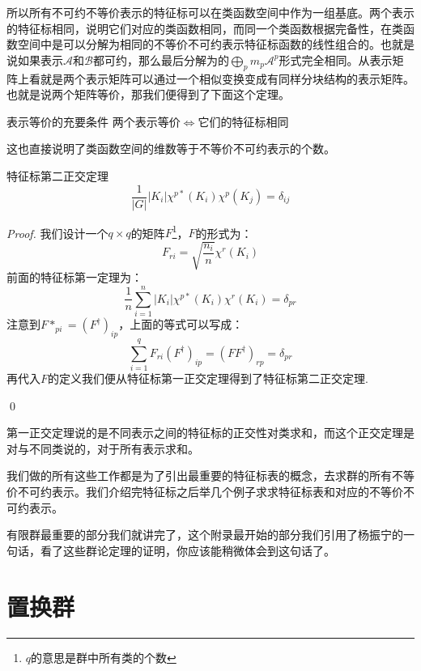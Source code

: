 所以所有不可约不等价表示的特征标可以在类函数空间中作为一组基底。两个表示的特征标相同，说明它们对应的类函数相同，而同一个类函数根据完备性，在类函数空间中是可以分解为相同的不等价不可约表示特征标函数的线性组合的。也就是说如果表示$\mathscr{A}$和$\mathscr{B}$都可约，那么最后分解为的$\bigoplus_p m_p\mathscr{A}^p$形式完全相同。从表示矩阵上看就是两个表示矩阵可以通过一个相似变换变成有同样分块结构的表示矩阵。也就是说两个矩阵等价，那我们便得到了下面这个定理。
\begin{theorem}{表示等价的充要条件}
	两个表示等价$\iff$它们的特征标相同
\end{theorem}
这也直接说明了类函数空间的维数等于不等价不可约表示的个数。
\begin{theorem}{特征标第二正交定理}
	\begin{equation}
		\frac{1}{|G|}|K_i|\chi^{p*}(K_i)\chi^{p}(K_j)=\delta_{ij}
	\end{equation}
\end{theorem}
\begin{proof}
	我们设计一个$q\times q$的矩阵$F$\footnote{$q$的意思是群中所有类的个数}，$F$的形式为：
	\[F_{ri}=\sqrt{\frac{n_i}{n}}\chi^r(K_i)\]
	前面的特征标第一定理为：
	\[\frac{1}{n}\sum_{i=1}^n|K_i|\chi^{p*}(K_i)\chi^r(K_i)=\delta_{pr}\]
	注意到$F*_{pi}=(F^\dagger)_{ip}$，上面的等式可以写成：
	\[\sum_{i=1}^q F_{ri}(F^\dagger)_{ip}=(FF^\dagger)_{rp}=\delta_{pr}\]
	再代入$F$的定义我们便从特征标第一正交定理得到了特征标第二正交定理.
	
	\qed
\end{proof}

第一正交定理说的是不同表示之间的特征标的正交性对类求和，而这个正交定理是对与不同类说的，对于所有表示求和。

我们做的所有这些工作都是为了引出最重要的特征标表的概念，去求群的所有不等价不可约表示。我们介绍完特征标之后举几个例子求求特征标表和对应的不等价不可约表示。

有限群最重要的部分我们就讲完了，这个附录最开始的部分我们引用了杨振宁的一句话，看了这些群论定理的证明，你应该能稍微体会到这句话了。

\section{置换群}